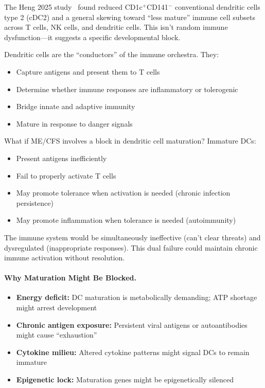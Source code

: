 \begin{open_question}
The Heng 2025 study~\cite{heng2025mecfs} found reduced CD1c$^+$CD141$^-$ conventional dendritic cells type 2 (cDC2) and a general skewing toward ``less mature'' immune cell subsets across T cells, NK cells, and dendritic cells. This isn't random immune dysfunction---it suggests a specific developmental block.

Dendritic cells are the ``conductors'' of the immune orchestra. They:
\begin{itemize}
    \item Capture antigens and present them to T cells
    \item Determine whether immune responses are inflammatory or tolerogenic
    \item Bridge innate and adaptive immunity
    \item Mature in response to danger signals
\end{itemize}

What if ME/CFS involves a block in dendritic cell maturation? Immature DCs:
\begin{itemize}
    \item Present antigens inefficiently
    \item Fail to properly activate T cells
    \item May promote tolerance when activation is needed (chronic infection persistence)
    \item May promote inflammation when tolerance is needed (autoimmunity)
\end{itemize}

The immune system would be simultaneously ineffective (can't clear threats) and dysregulated (inappropriate responses). This dual failure could maintain chronic immune activation without resolution.
\end{open_question}

\paragraph{Why Maturation Might Be Blocked.}
\begin{itemize}
    \item \textbf{Energy deficit:} DC maturation is metabolically demanding; ATP shortage might arrest development
    \item \textbf{Chronic antigen exposure:} Persistent viral antigens or autoantibodies might cause ``exhaustion''
    \item \textbf{Cytokine milieu:} Altered cytokine patterns might signal DCs to remain immature
    \item \textbf{Epigenetic lock:} Maturation genes might be epigenetically silenced
\end{itemize}

